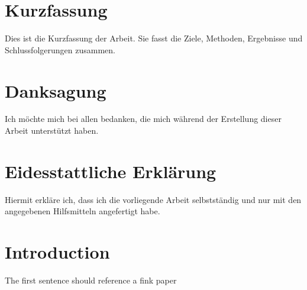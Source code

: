 \documentclass[man]{apa7}
\begin{document}
\maketitlepage

\newpage
\begin{abstract}
This is the abstract section. Hallo and It provides a summary of the thesis, including the purpose, methods, results, and conclusions. Typically, this section should be no longer than 250 words.

\vspace{2mm}

\noindent\textbf{Keywords:} \textit{Keyword1, Keyword2}

\vspace{5mm}

\end{abstract}

\newpage
\section*{Kurzfassung}
Dies ist die Kurzfassung der Arbeit. Sie fasst die Ziele, Methoden, Ergebnisse und Schlussfolgerungen zusammen.

\newpage
\section*{Danksagung}
Ich möchte mich bei allen bedanken, die mich während der Erstellung dieser Arbeit unterstützt haben.

\newpage
\section*{Eidesstattliche Erklärung}
Hiermit erkläre ich, dass ich die vorliegende Arbeit selbstständig und nur mit den angegebenen Hilfsmitteln angefertigt habe.

\newpage
\tableofcontents
\listoffigures  %
\listoftables   %
\newpage

\newpage
\section{Introduction}
The first sentence should reference a fink paper \cite{Fink2021}
\lipsum[1-4] %
\end{document}
